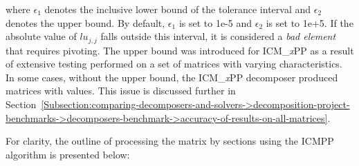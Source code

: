 where $\epsilon_1$ denotes the inclusive lower bound of the tolerance interval and $\epsilon_2$ denotes the upper bound. By default, $\epsilon_1$ is set to 1e-5 and $\epsilon_2$ is set to 1e+5. If the absolute value of $lu_{j, j}$ falls outside this interval, it is considered a \textit{bad element} that requires pivoting. The upper bound was introduced for ICM\_\textit{x}PP as a result of extensive testing performed on a set of matrices with varying characteristics. In some cases, without the upper bound, the ICM\_\textit{x}PP decomposer produced matrices with  values. This issue is discussed further in Section~\ref{Subsection:comparing-decomposers-and-solvers->decomposition-project-benchmarks->decomposers-benchmark->accuracy-of-results-on-all-matrices}.

For clarity, the outline of processing the matrix by sections using the ICMPP algorithm is presented below:

